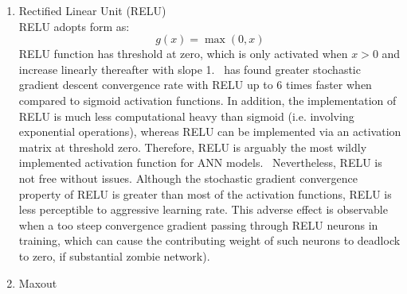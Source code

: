 \begin{enumerate}
\item Rectified Linear Unit (RELU) \\
RELU adopts form as:
\begin{equation}
    g(x) = \max(0,x)
\end{equation}
RELU function has threshold at zero, which is only activated when $x > 0$ and increase linearly thereafter with slope 1.~\citet{Krizhevsky_2017} has found greater stochastic gradient descent convergence rate with RELU up to 6 times faster when compared to sigmoid activation functions. In addition, the implementation of RELU is much less computational heavy than sigmoid (i.e. involving exponential operations), whereas RELU can be implemented via an activation matrix at threshold zero. Therefore, RELU is arguably the most wildly implemented activation function for ANN models.~\cite{Bengio_2012,Toth_2013,Jaitly_2011,nga}  Nevertheless, RELU is not free without issues. Although the stochastic gradient convergence property of RELU is greater than most of the activation functions, RELU is less perceptible to aggressive learning rate. This adverse effect is observable when a too steep convergence gradient passing through RELU neurons in training, which can cause the contributing weight of such neurons to deadlock to zero, if substantial zombie network). 

\item Maxout \\

\end{enumerate}